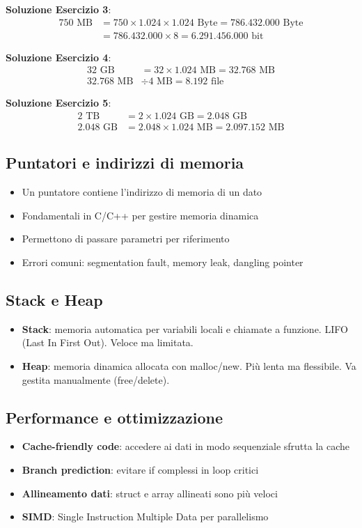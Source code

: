 \documentclass[12pt,a4paper]{article}
\begin{document}
\textbf{Soluzione Esercizio 3}:
\begin{align*}
750 \text{ MB} &= 750 \times 1.024 \times 1.024 \text{ Byte} = 786.432.000 \text{ Byte} \\
&= 786.432.000 \times 8 = 6.291.456.000 \text{ bit}
\end{align*}

\textbf{Soluzione Esercizio 4}:
\begin{align*}
32 \text{ GB} &= 32 \times 1.024 \text{ MB} = 32.768 \text{ MB} \\
32.768 \text{ MB} &\div 4 \text{ MB} = 8.192 \text{ file}
\end{align*}

\textbf{Soluzione Esercizio 5}:
\begin{align*}
2 \text{ TB} &= 2 \times 1.024 \text{ GB} = 2.048 \text{ GB} \\
2.048 \text{ GB} &= 2.048 \times 1.024 \text{ MB} = 2.097.152 \text{ MB}
\end{align*}

\subsection{Puntatori e indirizzi di memoria}
\begin{itemize}
    \item Un puntatore contiene l'indirizzo di memoria di un dato
    \item Fondamentali in C/C++ per gestire memoria dinamica
    \item Permettono di passare parametri per riferimento
    \item Errori comuni: segmentation fault, memory leak, dangling pointer
\end{itemize}

\subsection{Stack e Heap}
\begin{itemize}
    \item \textbf{Stack}: memoria automatica per variabili locali e chiamate a funzione. LIFO (Last In First Out). Veloce ma limitata.
    \item \textbf{Heap}: memoria dinamica allocata con malloc/new. Più lenta ma flessibile. Va gestita manualmente (free/delete).
\end{itemize}

\subsection{Performance e ottimizzazione}
\begin{itemize}
    \item \textbf{Cache-friendly code}: accedere ai dati in modo sequenziale sfrutta la cache
    \item \textbf{Branch prediction}: evitare if complessi in loop critici
    \item \textbf{Allineamento dati}: struct e array allineati sono più veloci
    \item \textbf{SIMD}: Single Instruction Multiple Data per parallelismo
\end{itemize}
\end{document}
